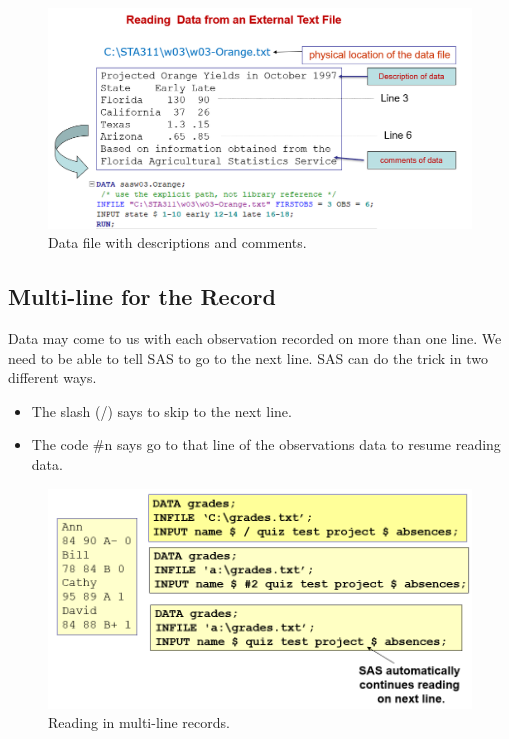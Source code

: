 \documentclass[
]{book}
\providecommand{\tightlist}{%
  \setlength{\itemsep}{0pt}\setlength{\parskip}{0pt}}
\begin{document}
\begin{figure}

{\centering \includegraphics[width=0.8\linewidth]{img03/w03-readInExternalTextFiles01} 

}

\caption{Data file with descriptions and comments.}\label{fig:unnamed-chunk-20}
\end{figure}

\hypertarget{multi-line-for-the-record}{%
\subsection{Multi-line for the Record}\label{multi-line-for-the-record}}

Data may come to us with each observation recorded on more than one line. We need to be able to tell SAS to go to the next line. SAS can do the trick in two different ways.

\begin{itemize}
\tightlist
\item
  The slash (/) says to skip to the next line.
\item
  The code \#n says go to that line of the observations data to resume reading data.
\end{itemize}

\begin{figure}

{\centering \includegraphics[width=0.8\linewidth]{img03/w03-multi-line-record} 

}

\caption{Reading in multi-line records.}\label{fig:unnamed-chunk-21}
\end{figure}
\end{document}
